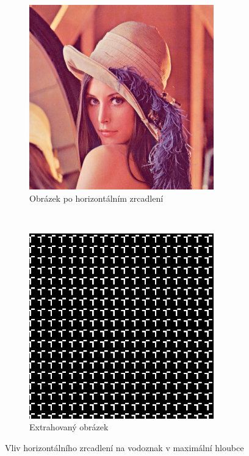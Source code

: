 \begin{figure}[h!]
    \begin{center}
        \begin{subfigure}[t]{0.5\textwidth}
            \centering
            \includegraphics[height=8cm]{images/flip_horizontal.jpg}
            \caption{Obrázek po horizontálním zrcadlení}
        \end{subfigure}%
        ~
        \begin{subfigure}[t]{0.5\textwidth}
            \centering
            \includegraphics[height=8cm]{images/flip_horizontal_extracted.jpg}
            \caption{Extrahovaný obrázek}
        \end{subfigure}
        \caption{Vliv horizontálního zrcadlení na vodoznak v maximální hloubce}
    \end{center}
\end{figure}


